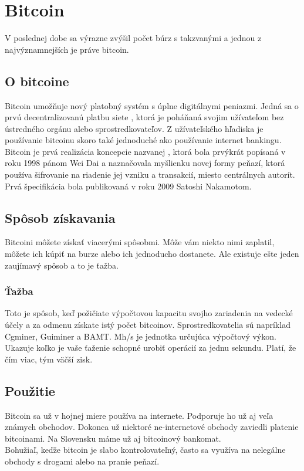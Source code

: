 \section{Bitcoin} 
V poslednej dobe sa výrazne zvýšil počet búrz s takzvanými  a jednou z najvýznamnejších je práve bitcoin. 
\subsection{O bitcoine} 
Bitcoin umožňuje nový platobný systém s úplne digitálnymi peniazmi. Jedná sa o prvú decentralizovanú platbu siete , ktorá je poháňaná svojim užívateľom bez ústredného orgánu alebo sprostredkovateľov. Z užívateľského hľadiska je používanie bitcoinu skoro také jednoduché ako používanie internet bankingu. Bitcoin je prvá realizácia koncepcie nazvanej , ktorá bola prvýkrát popísaná v roku 1998 pánom Wei Dai a naznačovala myšlienku novej formy peňazí, ktorá používa šifrovanie na riadenie jej vzniku a transakcií, miesto centrálnych autorít.  Prvá špecifikácia bola publikovaná v roku 2009  Satoshi Nakamotom. 
\subsection{Spôsob získavania} 
Bitcoini môžete získať viacerými spôsobmi. Môže vám niekto nimi zaplatil, môžete ich kúpiť na burze alebo ich jednoducho dostanete. Ale existuje ešte jeden zaujímavý spôsob a to je ťažba. 
\subsubsection{Ťažba} 
Toto je spôsob, keď požičiate výpočtovou kapacitu svojho zariadenia na vedecké účely a za odmenu získate istý počet bitcoinov. 
 Sprostredkovatelia sú napríklad  Cgminer, Guiminer a BAMT. Mh/s je jednotka určujúca výpočtový výkon. Ukazuje koľko je vaše ťaženie schopné urobiť operácií za jednu sekundu. Platí, že čím viac, tým väčší zisk. 
\subsection{Použitie} 
Bitcoin sa už v hojnej miere používa na internete. Podporuje ho už aj veľa známych obchodov. Dokonca už niektoré ne-internetové obchody zaviedli platenie bitcoinami. Na Slovensku máme už aj bitcoinový bankomat. 
 \\ 
Bohužiaľ, keďže bitcoin je slabo kontrolovateľný, často sa využíva na nelegálne obchody s drogami alebo na pranie peňazí. \cite{B} 
